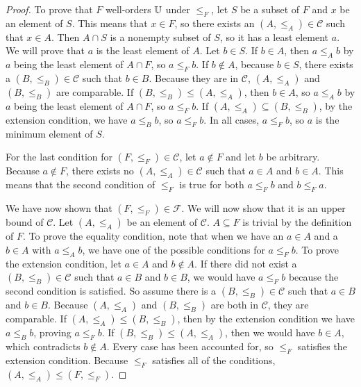 \documentclass[../../math.tex]{subfiles}
\begin{document}
\begin{proof}
    To prove that $F$ well-orders $\mathbb{U}$ under $\leq_F$, let $S$ be a subset of
    $F$ and $x$ be an element of $S$.  This means that $x \in F$, so there
    exists an $(A, \leq_A) \in \mathcal C$ such that $x \in A$.  Then $A \cap S$
    is a nonempty subset of $S$, so it has a least element $a$.  We will prove
    that $a$ is the least element of $A$.  Let $b \in S$.  If $b \in A$, then $a
    \leq_A b$ by $a$ being the least element of $A \cap F$, so $a \leq_F b$.  If
    $b \notin A$, because $b \in S$, there exists a $(B, \leq_B) \in \mathcal C$
    such that $b \in B$.  Because they are in $\mathcal C$, $(A, \leq_A)$ and
    $(B, \leq_B)$ are comparable.  If $(B, \leq_B) \leq (A, \leq_A)$, then $b
    \in A$, so $a \leq_A b$ by $a$ being the least element of $A \cap F$, so $a
    \leq_F b$.  If $(A, \leq_A) \subseteq (B, \leq_B)$, by the extension
    condition, we have $a \leq_B b$, so $a \leq_F b$.  In all cases, $a \leq_F
    b$, so $a$ is the minimum element of $S$.

    For the last condition for $(F, \leq_F) \in \mathcal C$, let $a \notin F$
    and let $b$ be arbitrary.  Because $a \notin F$, there exists no $(A,
    \leq_A) \in \mathcal C$ such that $a \in A$ and $b \in A$.  This means that
    the second condition of $\leq_F$ is true for both $a \leq_F b$ and $b \leq_F
    a$.

    We have now shown that $(F, \leq_F) \in \mathcal F$.  We will now show that
    it is an upper bound of $\mathcal C$.  Let $(A, \leq_A)$ be an element of
    $\mathcal C$.  $A \subseteq F$ is trivial by the definition of $F$.  To
    prove the equality condition, note that when we have an $a \in A$ and a $b
    \in A$ with $a \leq_A b$, we have one of the possible conditions for $a
    \leq_F b$.  To prove the extension condition, let $a \in A$ and $b \notin
    A$.  If there did not exist a $(B, \leq_B) \in \mathcal C$ such that $a \in
    B$ and $b \in B$, we would have $a \leq_F b$ because the second condition is
    satisfied.  So assume there is a $(B, \leq_B) \in \mathcal C$ such that $a
    \in B$ and $b \in B$.  Because $(A, \leq_A)$ and $(B, \leq_B)$ are both in
    $\mathcal C$, they are comparable.  If $(A, \leq_A) \leq (B, \leq_B)$, then
    by the extension condition we have $a \leq_B b$, proving $a \leq_F b$.  If
    $(B, \leq_B) \leq (A, \leq_A)$, then we would have $b \in A$, which
    contradicts $b \notin A$.  Every case has been accounted for, so $\leq_F$
    satisfies the extension condition.  Because $\leq_F$ satisfies all of the
    conditions, $(A, \leq_A) \leq (F, \leq_F)$.


\end{proof}
\end{document}
